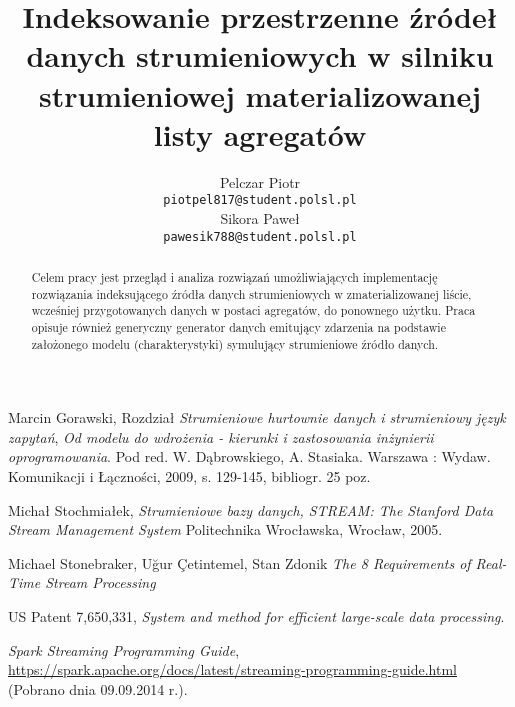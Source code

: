 \documentclass[12pt]{article}
\title{Indeksowanie przestrzenne źródeł danych strumieniowych w silniku strumieniowej materializowanej listy agregatów}
\author{
	  Pelczar Piotr\\
	  \small{\texttt{piotpel817@student.polsl.pl}}
	  \\[3ex]
	  Sikora Paweł\\
	  \small{\texttt{pawesik788@student.polsl.pl}}
	}
\date{\displaydate{date}}
\begin{document}
\maketitle
 
\begin{abstract}
Celem pracy jest przegląd i analiza rozwiązań umożliwiających implementację rozwiązania indeksującego źródła danych strumieniowych w zmaterializowanej liście, wcześniej przygotowanych danych w postaci agregatów, do ponownego użytku. Praca opisuje również generyczny generator danych emitujący zdarzenia na podstawie założonego modelu (charakterystyki) symulujący strumieniowe źródło danych.
\end{abstract}

\renewcommand{\contentsname}{Contents}

\newpage
\tableofcontents

\newpage











\newpage
\begin{thebibliography}{9}

  Marcin Gorawski,
  Rozdział \emph{Strumieniowe hurtownie danych i strumieniowy język zapytań},
  \emph{Od modelu do wdrożenia - kierunki i zastosowania inżynierii oprogramowania}.
  Pod red. W. Dąbrowskiego, A. Stasiaka.
  Warszawa : Wydaw. Komunikacji i Łączności,
  2009,
  s. 129-145,
  bibliogr. 25 poz.

  Michał Stochmiałek,
  \emph{Strumieniowe bazy danych, STREAM: The Stanford Data Stream Management System}
  Politechnika Wrocławska,
  Wrocław, 2005.

  Michael Stonebraker, Uğur Çetintemel, Stan Zdonik
  \emph{The 8 Requirements of Real-Time Stream Processing}

  US Patent 7,650,331,
  \emph{System and method for efficient large-scale data processing}.

  \emph{Spark Streaming Programming Guide},
  \url{https://spark.apache.org/docs/latest/streaming-programming-guide.html}
  (Pobrano dnia 09.09.2014 r.).


\end{thebibliography}

%
\end{document}
